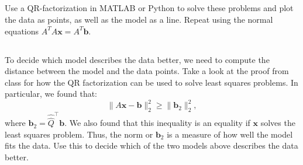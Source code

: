 \documentclass[11pt,letterpaper]{article}
\begin{document}
\subsection{} Use a QR-factorization in MATLAB or Python to solve these
  problems and plot the data as points, as well as the model as a
  line. Repeat using the normal equations $A^TA\boldsymbol x =
  A^T\boldsymbol b$.
\subsection{} To decide which model describes the data better, we need to
  compute the distance between the model and the data points. Take a
  look at the proof from class for how  the QR  factorization can be
  used to solve least squares  problems. In  particular, we found
  that:
  $$
  \|A\boldsymbol x  - \boldsymbol  b\|_2^2 \ge \|\boldsymbol b_2\|_2^2,
  $$ where $\boldsymbol b_2 = \hat{\hat Q}^\top\boldsymbol b$. We also
  found that this inequality is an equality if $\boldsymbol x$ solves
  the least squares problem. Thus, the norm or $\boldsymbol b_2$ is a
  measure of how well the model fits the data. Use this to decide
  which of the two models above describes the data better.


\end{document}
